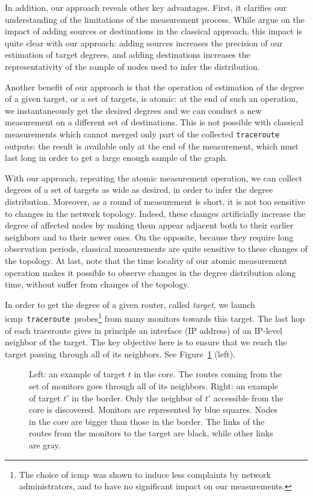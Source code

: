 \documentclass[conference]{IEEEtran}
\newcommand{\traceroute}{{\tt traceroute}}
\newcommand{\icmp}{{\sc icmp}}
\begin{document}
In addition, our approach reveals other key advantages. First, it clarifies our understanding of the limitations of the measurement process. While \cite{DBLP:conf/imw/BarfordBBC01} argue on the impact of adding sources or destinations in the classical approach, this impact is quite clear with our approach: adding sources increases the precision of our estimation of target degrees, and adding destinations increases the representativity of the sample of nodes used to infer the distribution.

Another benefit of our approach is that the operation of estimation of the degree of a given target, or a set of targets, is atomic: at the end of such an operation, we instantaneously get the desired degrees and we can conduct a new measurement on a different set of destinations. This is not possible with classical measurements which cannot merged only part of the collected \texttt{traceroute} outputs: the result is available only at the end of the measurement, which must last long in order to get a large enough sample of the graph.

With our approach, repeating the atomic measurement operation, we can collect degrees of a set of targets as wide as desired, in order to infer the degree distribution. Moreover, as a round of measurement is short, it is not too sensitive to changes in the network topology. Indeed, these changes artificially increase the degree of affected nodes by making them appear adjacent both to their earlier neighbors and to their newer ones.
On the opposite, because they require long observation periods, classical measurements are quite sensitive to these changes of the topology.
At last, note that the time locality of our atomic measurement operation makes it possible to observe changes in the degree distribution along time, without suffer from changes of the topology.



In order to get the degree of a given router, called {\em target}, we launch \icmp\ \traceroute\ probes\footnote{The choice of \icmp\ was shown to induce less complaints by network administrators, and to have no significant impact on our measurements.}
from many monitors towards this target. The last hop of each traceroute gives in principle an interface (IP address) of an IP-level neighbor of the target. The key objective here is to ensure that we reach the target passing through all of its neighbors. See Figure~\ref{fig-approach} (left).



\begin{figure}
\centering

\caption{
Left: an example of target $t$ in the core. The routes coming from the set of monitors goes through all of its neighbors.
Right: an example of target $t'$ in the border. Only the neighbor of $t'$ accessible from the core is discovered.
Monitors are represented by blue squares. Nodes in the core are bigger than those in the border. The links of the routes from the monitors to the target are black, while other links are gray.
}
\label{fig-approach}
\end{figure}
\end{document}
